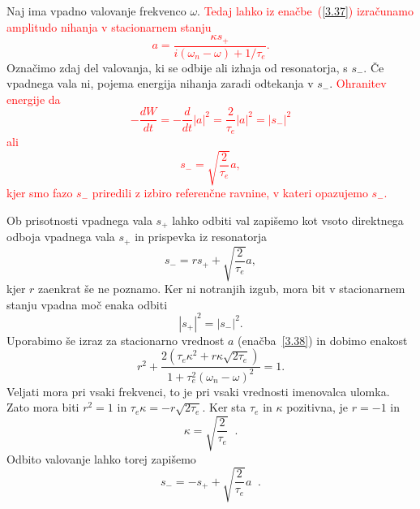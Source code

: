 Naj ima vpadno valovanje frekvenco $\omega$. \textcolor{red}{Tedaj lahko iz enačbe~(\ref{3.37}) 
izračunamo amplitudo nihanja v stacionarnem stanju
\begin{equation}
a=\frac{\kappa s_{+}}{i(\omega_{n}-\omega)+1/\tau_{e}}.
\label{3.38}
\end{equation}
 }
Označimo zdaj del valovanja, ki se odbije ali izhaja od resonatorja, s $s_{-}$.
Če vpadnega vala ni, pojema energija nihanja zaradi odtekanja v $s_{-}$.
\textcolor{red}{Ohranitev energije da 
\begin{equation}
-\frac{dW}{dt}=-\frac{d}{dt}|a|^{2}=\frac{2}{\tau_{e}}|a|^{2}=|s_{-}|^{2}
\label{3.39}
\end{equation}
ali 
\begin{equation}
s_{-}=\sqrt{\frac{2}{\tau_{e}}}a,
\label{3.40}
\end{equation}
kjer smo fazo $s_{-}$ priredili z izbiro referenčne ravnine, v kateri
opazujemo $s_{-}$.}

Ob prisotnosti vpadnega vala $s_{+}$ lahko odbiti val zapišemo kot
vsoto direktnega odboja vpadnega vala $s_{+}$ in prispevka iz resonatorja
\begin{equation}
s_{-}=rs_{+}+\sqrt{\frac{2}{\tau_{e}}}a,
\label{3.41}
\end{equation}
kjer $r$ zaenkrat še ne poznamo. Ker ni notranjih izgub, mora bit v 
stacionarnem stanju vpadna moč enaka odbiti 
\begin{equation}
|s_{+}|^{2}=|s_{-}|^{2}.
\label{3.42}
\end{equation}
Uporabimo še izraz za stacionarno vrednost $a$  (enačba~\ref{3.38}) in dobimo
enakost 
\begin{equation}
r^{2}+\frac{2(\tau_{e}\kappa^{2}+r\kappa\sqrt{2\tau_{e}})}{1+\tau_{e}^{2}(\omega_{n}-\omega)^{2}}=1.
\label{3.43}
\end{equation}
 Veljati mora pri vsaki frekvenci, to je pri vsaki vrednosti imenovalca
ulomka. Zato mora biti $r^{2}=1$ in $\tau_{e}\kappa=-r\sqrt{2\tau_{e}}$.
Ker sta $\tau_{e}$ in $\kappa$ pozitivna, je $r=-1$ in 
\begin{equation}
\kappa=\sqrt{\frac{2}{\tau_{e}}}\;\;.\label{3.44}
\end{equation}
 Odbito valovanje lahko torej zapišemo 
\begin{equation}
s_{-}=-s_{+}+\sqrt{\frac{2}{\tau_{e}}}a\;\;.\label{3.45}
\end{equation}

